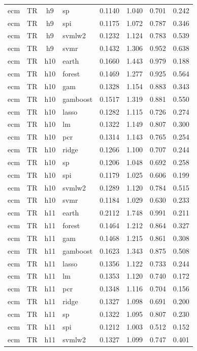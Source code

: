 \begin{ThreePartTable}
\begin{longtable}[t]{llclcccc}
ecm & TR & h9 & sp & 0.1140 & 1.040 & 0.701 & 0.242\\
ecm & TR & h9 & spi & 0.1175 & 1.072 & 0.787 & 0.346\\
ecm & TR & h9 & svmlw2 & 0.1232 & 1.124 & 0.783 & 0.539\\
ecm & TR & h9 & svmr & 0.1432 & 1.306 & 0.952 & 0.638\\
\addlinespace
ecm & TR & h10 & earth & 0.1660 & 1.443 & 0.979 & 0.188\\
ecm & TR & h10 & forest & 0.1469 & 1.277 & 0.925 & 0.564\\
ecm & TR & h10 & gam & 0.1328 & 1.154 & 0.883 & 0.343\\
ecm & TR & h10 & gamboost & 0.1517 & 1.319 & 0.881 & 0.550\\
ecm & TR & h10 & lasso & 0.1282 & 1.115 & 0.726 & 0.274\\
ecm & TR & h10 & lm & 0.1322 & 1.149 & 0.807 & 0.300\\
ecm & TR & h10 & pcr & 0.1314 & 1.143 & 0.765 & 0.254\\
ecm & TR & h10 & ridge & 0.1266 & 1.100 & 0.707 & 0.244\\
ecm & TR & h10 & sp & 0.1206 & 1.048 & 0.692 & 0.258\\
ecm & TR & h10 & spi & 0.1179 & 1.025 & 0.606 & 0.199\\
ecm & TR & h10 & svmlw2 & 0.1289 & 1.120 & 0.784 & 0.515\\
ecm & TR & h10 & svmr & 0.1184 & 1.029 & 0.630 & 0.233\\
\addlinespace
ecm & TR & h11 & earth & 0.2112 & 1.748 & 0.991 & 0.211\\
ecm & TR & h11 & forest & 0.1464 & 1.212 & 0.864 & 0.327\\
ecm & TR & h11 & gam & 0.1468 & 1.215 & 0.861 & 0.308\\
ecm & TR & h11 & gamboost & 0.1623 & 1.343 & 0.875 & 0.508\\
ecm & TR & h11 & lasso & 0.1356 & 1.122 & 0.733 & 0.244\\
ecm & TR & h11 & lm & 0.1353 & 1.120 & 0.740 & 0.172\\
ecm & TR & h11 & pcr & 0.1348 & 1.116 & 0.704 & 0.156\\
ecm & TR & h11 & ridge & 0.1327 & 1.098 & 0.691 & 0.200\\
ecm & TR & h11 & sp & 0.1322 & 1.095 & 0.807 & 0.230\\
ecm & TR & h11 & spi & 0.1212 & 1.003 & 0.512 & 0.152\\
ecm & TR & h11 & svmlw2 & 0.1327 & 1.099 & 0.747 & 0.401\\

\end{longtable}
\end{ThreePartTable}

